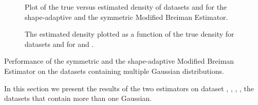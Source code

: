 \begin{figure}
	\centering
	
	\caption{Plot of the true versus estimated density of datasets \ferdosiTwo and \baakmanTwo for the shape-adaptive and the symmetric Modified Breiman Estimator.}
	\label{fig:results:multiSphere:two:comparativePlots}
\end{figure}

\begin{figure}
	\centering
	
	\caption{The estimated density plotted as a function of the true density for datasets \ferdosiThree and \baakmanThree for \mbe and \sambe.}
	\label{fig:results:multiSphere:three:comparativePlots}
\end{figure}

\begin{table}
	\centering
	
	\caption{Performance of the symmetric and the shape-adaptive Modified Breiman Estimator on the datasets containing multiple Gaussian distributions.} 	
	\label{tab:results:multiSphere:mse}
\end{table}

In this section we present the results of the two estimators on dataset \ferdosiTwo, \baakmanTwo, \ferdosiThree, \baakmanThree, \ie the datasets that contain more than one Gaussian.





